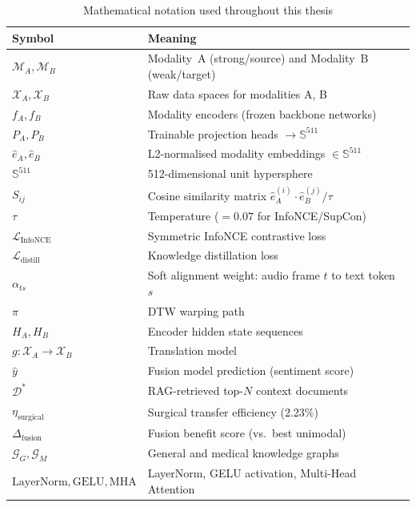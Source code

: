 \documentclass[12pt,a4paper]{article}
\theoremstyle{definition}
\theoremstyle{plain}
\theoremstyle{remark}
\newcommand{\Sph}{\mathbb{S}}
\newcommand{\KG}{\mathcal{G}}
\newcommand{\LN}{\mathrm{LayerNorm}}
\newcommand{\GELU}{\mathrm{GELU}}
\newcommand{\MHA}{\mathrm{MHA}}
\newcommand{\MA}{\mathcal{M}_A}
\newcommand{\MB}{\mathcal{M}_B}
\begin{document}
\begin{table}[H]
\centering
\caption{Mathematical notation used throughout this thesis}
\begin{tabular}{ll}
\toprule
\textbf{Symbol} & \textbf{Meaning} \\
\midrule
$\MA, \MB$ & Modality~A (strong/source) and Modality~B (weak/target) \\
$\mathcal{X}_A, \mathcal{X}_B$ & Raw data spaces for modalities A, B \\
$f_A, f_B$ & Modality encoders (frozen backbone networks) \\
$P_A, P_B$ & Trainable projection heads $\to \Sph^{511}$ \\
$\hat{e}_A, \hat{e}_B$ & L2-normalised modality embeddings $\in \Sph^{511}$ \\
$\Sph^{511}$ & 512-dimensional unit hypersphere \\
$S_{ij}$ & Cosine similarity matrix $\hat{e}_A^{(i)} \cdot \hat{e}_B^{(j)} / \tau$ \\
$\tau$ & Temperature ($= 0.07$ for InfoNCE/SupCon) \\
$\mathcal{L}_{\text{InfoNCE}}$ & Symmetric InfoNCE contrastive loss \\
$\mathcal{L}_{\text{distill}}$ & Knowledge distillation loss \\
$\alpha_{ts}$ & Soft alignment weight: audio frame $t$ to text token $s$ \\
$\pi$ & DTW warping path \\
$H_A, H_B$ & Encoder hidden state sequences \\
$g : \mathcal{X}_A \to \mathcal{X}_B$ & Translation model \\
$\hat{y}$ & Fusion model prediction (sentiment score) \\
$\mathcal{D}^*$ & RAG-retrieved top-$N$ context documents \\
$\eta_{\text{surgical}}$ & Surgical transfer efficiency (2.23\%) \\
$\Delta_{\text{fusion}}$ & Fusion benefit score (vs.\ best unimodal) \\
$\KG_G, \KG_M$ & General and medical knowledge graphs \\
$\LN, \GELU, \MHA$ & LayerNorm, GELU activation, Multi-Head Attention \\
\bottomrule
\end{tabular}
\end{table}

\newpage
\end{document}

